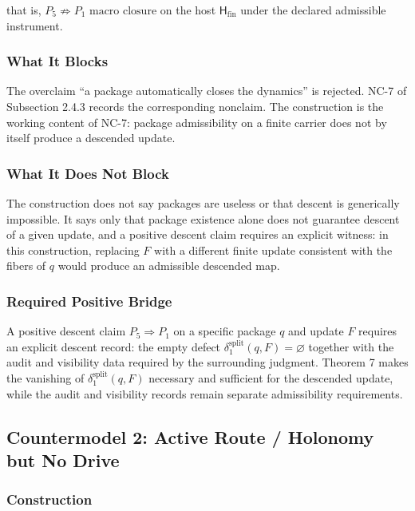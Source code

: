 \documentclass[11pt]{article}
\theoremstyle{definition}
\begin{document}
that is, \(P_5\not\Rightarrow P_1\text{ macro closure}\) on the host \(\mathsf H_{\mathrm{fin}}\) under the declared admissible instrument.

\subsubsection{What It Blocks}

The overclaim ``a package automatically closes the dynamics'' is rejected. NC-7 of Subsection 2.4.3 records the corresponding nonclaim. The construction is the working content of NC-7: package admissibility on a finite carrier does not by itself produce a descended update.

\subsubsection{What It Does Not Block}

The construction does not say packages are useless or that descent is generically impossible. It says only that package existence alone does not guarantee descent of a given update, and a positive descent claim requires an explicit witness: in this construction, replacing \(F\) with a different finite update consistent with the fibers of \(q\) would produce an admissible descended map.

\subsubsection{Required Positive Bridge}

A positive descent claim \(P_5\Rightarrow P_1\) on a specific package \(q\) and update \(F\) requires an explicit descent record: the empty defect \(\delta_1^{\mathrm{split}}(q,F)=\varnothing\) together with the audit and visibility data required by the surrounding judgment. Theorem 7 makes the vanishing of \(\delta_1^{\mathrm{split}}(q,F)\) necessary and sufficient for the descended update, while the audit and visibility records remain separate admissibility requirements.

\subsection{Countermodel 2: Active Route / Holonomy but No Drive}

\subsubsection{Construction}
\end{document}
